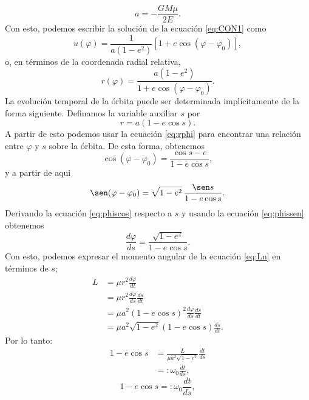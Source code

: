 \begin{equation}
    a= -\frac{GM\mu}{2E}. \label{eq:aE}
\end{equation}
Con esto, podemos escribir la solución de la ecuación \ref{eq:CON1} como 
\begin{equation}
    u(\varphi)=\frac{1}{a(1-e^2)}\left[1+e\cos
    (\varphi-\varphi_0)\right],
    \end{equation}
    o, en términos de la coordenada radial relativa,
    \begin{equation}\label{eq:rphi}
    r(\varphi)=\frac{a(1-e^2)}{1+e\cos(\varphi-\varphi_0)}.
\end{equation}
La evolución temporal de la órbita puede ser determinada implícitamente de la forma siguiente. Definamos la variable auxiliar
$s$ por
\begin{equation}\label{eq:rs}
    r=a(1-e\cos s).
\end{equation}
A partir de esto podemos usar la ecuación \ref{eq:rphi} para encontrar una relación entre $\varphi$ y $s$ sobre la órbita.
De esta forma, obtenemos 
\begin{equation}\label{eq:phiscos}
    \cos(\varphi-\varphi_0)=\frac{\cos s -e}{1-e\cos s},
\end{equation}
y a partir de aqui
\begin{equation}\label{eq:phissen}
    \sen(\varphi-\varphi_0)=\sqrt{1-e^2}\,\frac{\sen s}{1-e\cos s}.
\end{equation}
Derivando la ecuación \ref{eq:phiscos} respecto a $s$ y usando la ecuación \ref{eq:phissen} obtenemos 
\begin{equation*}
    \frac{d\varphi}{ds}=\frac{\sqrt{1-e^2}}{1-e\cos s}.
\end{equation*}
Con esto, podemos expresar el momento angular de la ecuación \ref{eq:Ln} en términos de $s$;
\begin{align*}
    L & = \mu r^2 \frac{d\varphi}{dt} \\
    & = \mu r^2 \frac{d\varphi}{ds}\frac{ds}{dt} \\
    & = \mu a^2\left(1-e\cos s\right)^2 \frac{d\varphi}{ds}\frac{ds}{dt} \\
    & = \mu a^2\sqrt{1-e^2}\left(1-e\cos s\right) \frac{ds}{dt} .
\end{align*}
Por lo tanto:
\begin{align*}
    1-e\cos s & = \frac{L}{\mu a^2\sqrt{1-e^2}} \frac{dt}{ds} \\
    & =: \omega_0 \frac{dt}{ds},
\end{align*}
\begin{equation}
    1-e\cos s =: \omega_0 \frac{dt}{ds}, \label{eq:dtds}
\end{equation}
